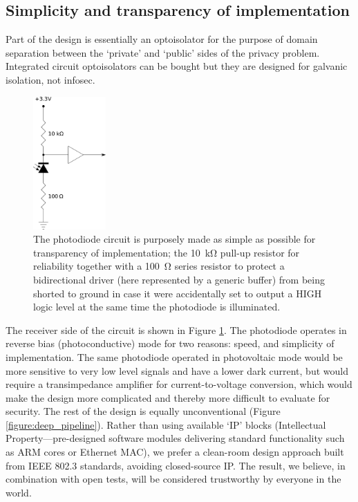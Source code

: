 \documentclass[conference]{IEEEtran}
\begin{document}
\subsection{Simplicity and transparency of implementation}

Part of the design is essentially an optoisolator for the purpose of domain
separation between the `private' and `public' sides of the privacy problem.
Integrated circuit optoisolators can be bought but they are designed for
galvanic isolation, not infosec.

\begin{figure}[!t]
    \centering
	\includegraphics[height=2in]{graphics/photodiode_pullup_and_GPIO_protection.png}
	\caption{The photodiode circuit is purposely made as simple as possible
        for transparency of implementation; the \SI{10}{\kilo\ohm} pull-up
        resistor for reliability together with a \SI{100}{\ohm} series
        resistor to protect a bidirectional driver (here represented by a
        generic buffer) from being shorted to ground in case it were
        accidentally set to output a HIGH logic level at the same time the
        photodiode is illuminated.}
	\label{figure:photodiode_pullup}
\end{figure}

The receiver side of the circuit is shown in Figure
\ref{figure:photodiode_pullup}. The photodiode operates in reverse bias
(photoconductive) mode for two reasons: speed, and simplicity of
implementation. The same photodiode operated in photovoltaic mode would be
more sensitive to very low level signals and have a lower dark current, but
would require a transimpedance amplifier for current-to-voltage conversion,
which would make the design more complicated and thereby more difficult to
evaluate for security. The rest of the design is equally unconventional
(Figure \ref{figure:deep_pipeline}). Rather than using available `IP' blocks
(Intellectual Property---pre-designed software modules delivering standard
functionality such as ARM cores or Ethernet MAC), we prefer a clean-room
design approach built from IEEE 802.3 standards, avoiding closed-source IP.
The result, we believe, in combination with open tests, will be considered
trustworthy by everyone in the world.
\end{document}
